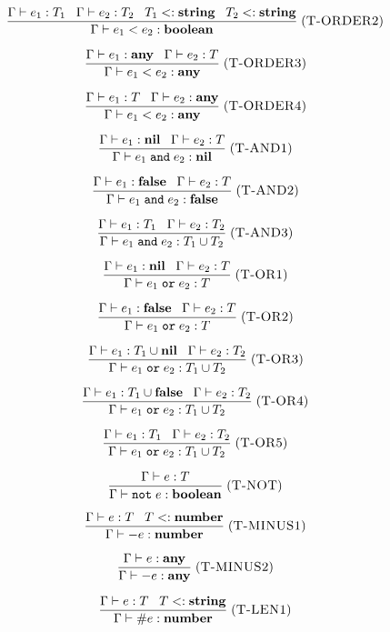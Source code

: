 \documentclass[12pt]{article}
\newcommand{\Any}{\mathbf{any}}
\newcommand{\Nil}{\mathbf{nil}}
\newcommand{\False}{\mathbf{false}}
\newcommand{\Boolean}{\mathbf{boolean}}
\newcommand{\Number}{\mathbf{number}}
\newcommand{\String}{\mathbf{string}}
\newcommand{\kw}[1]{\mathbf{\texttt{#1}}}
\newcommand{\mylabel}[1]{\; (\textsc{#1})}
\newcommand{\subtype}{<:}
\newcommand{\env}{\Gamma}
\begin{document}
\[
\frac{\env \vdash e_{1}:T_{1} \;\;\;
      \env \vdash e_{2}:T_{2} \;\;\;
      T_{1} \subtype \String \;\;\;
      T_{2} \subtype \String}
     {\env \vdash e_{1} < e_{2} : \Boolean}
\mylabel{T-ORDER2}
\]

\[
\frac{\env \vdash e_{1}:\Any \;\;\;
      \env \vdash e_{2}:T}
     {\env \vdash e_{1} < e_{2} : \Any}
\mylabel{T-ORDER3}
\]

\[
\frac{\env \vdash e_{1}:T \;\;\;
      \env \vdash e_{2}:\Any}
     {\env \vdash e_{1} < e_{2} : \Any}
\mylabel{T-ORDER4}
\]

\[
\frac{\env \vdash e_{1}:\Nil \;\;\;
      \env \vdash e_{2}:T}
     {\env \vdash e_{1} \; \kw{and} \; e_{2} : \Nil}
\mylabel{T-AND1}
\]

\[
\frac{\env \vdash e_{1}:\False \;\;\;
      \env \vdash e_{2}:T}
     {\env \vdash e_{1} \; \kw{and} \; e_{2} : \False}
\mylabel{T-AND2}
\]

\[
\frac{\env \vdash e_{1}:T_{1} \;\;\;
      \env \vdash e_{2}:T_{2}}
     {\env \vdash e_{1} \; \kw{and} \; e_{2} : T_{1} \cup T_{2}}
\mylabel{T-AND3}
\]

\[
\frac{\env \vdash e_{1}:\Nil \;\;\;
      \env \vdash e_{2}:T}
     {\env \vdash e_{1} \; \kw{or} \; e_{2} : T}
\mylabel{T-OR1}
\]

\[
\frac{\env \vdash e_{1}:\False \;\;\;
      \env \vdash e_{2}:T}
     {\env \vdash e_{1} \; \kw{or} \; e_{2} : T}
\mylabel{T-OR2}
\]

\[
\frac{\env \vdash e_{1}:T_{1} \cup \Nil \;\;\;
      \env \vdash e_{2}:T_{2}}
     {\env \vdash e_{1} \; \kw{or} \; e_{2} : T_{1} \cup T_{2}}
\mylabel{T-OR3}
\]

\[
\frac{\env \vdash e_{1}:T_{1} \cup \False \;\;\;
      \env \vdash e_{2}:T_{2}}
     {\env \vdash e_{1} \; \kw{or} \; e_{2} : T_{1} \cup T_{2}}
\mylabel{T-OR4}
\]

\[
\frac{\env \vdash e_{1}:T_{1} \;\;\;
      \env \vdash e_{2}:T_{2}}
     {\env \vdash e_{1} \; \kw{or} \; e_{2} : T_{1} \cup T_{2}}
\mylabel{T-OR5}
\]

\[
\frac{\env \vdash e:T}
     {\env \vdash \kw{not} \; e : \Boolean}
\mylabel{T-NOT}
\]

\[
\frac{\env \vdash e:T \;\;\;
      T \subtype \Number}
     {\env \vdash - e : \Number}
\mylabel{T-MINUS1}
\]

\[
\frac{\env \vdash e:\Any}
     {\env \vdash - e : \Any}
\mylabel{T-MINUS2}
\]

\[
\frac{\env \vdash e:T \;\;\;
      T \subtype \String}
     {\env \vdash \# e : \Number}
\mylabel{T-LEN1}
\]
\end{document}
